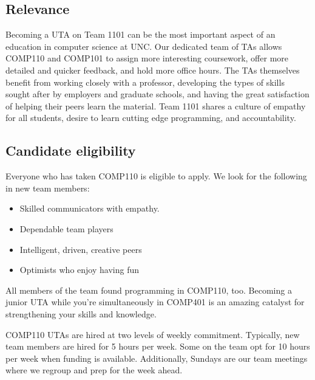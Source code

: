 \documentclass[a4paper]{article}
\begin{document}
\subsection{Relevance}

Becoming a UTA on Team 1101 can be the most important aspect of an education in computer science at UNC. Our dedicated team of TAs allows COMP110 and COMP101 to assign more interesting coursework, offer more detailed and quicker feedback, and hold more office hours. The TAs themselves benefit from working closely with a professor, developing the types of skills sought after by employers and graduate schools, and having the great satisfaction of helping their peers learn the material. Team 1101 shares a culture of empathy for all students, desire to learn cutting edge programming, and accountability.

\subsection{Candidate eligibility}
Everyone who has taken COMP110 is eligible to apply. We look for the following in new team members: 
\begin{itemize}
\item Skilled communicators with empathy. 
\item Dependable team players
\item Intelligent, driven, creative peers
\item Optimists who enjoy having fun 
\end{itemize}
\begin{flushleft}
All members of the team found programming in COMP110, too. Becoming a junior UTA while you're simultaneously in COMP401 is an amazing catalyst for strengthening your skills and knowledge.
\end{flushleft}
\begin{flushleft}
COMP110 UTAs are hired at two levels of weekly commitment. Typically, new team members are hired for 5 hours per week. Some on the team opt for 10 hours per week when funding is available. Additionally, Sundays are our team meetings where we regroup and prep for the week ahead.
\end{flushleft}
\end{document}
